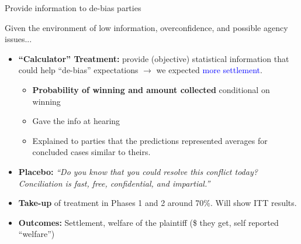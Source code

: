 \documentclass[9pt]{beamer}
\begin{document}

\begin{frame}{Provide information to de-bias parties}

    Given the environment of low information, overconfidence, and possible agency issues...
        \vspace{0.1in}
        
    \begin{itemize}
        \item \textbf{``Calculator'' Treatment:} provide (objective) statistical information that could help \alert{``de-bias'' expectations} $\rightarrow$ we expected  \textcolor{blue}{more settlement}.
          \begin{itemize}
              \vspace{.05in}
              \item \textbf{Probability of winning and amount collected} conditional on winning
              \vspace{.05in}
              \item Gave the info at hearing
                  \vspace{.05in}
                  \item Explained to parties that the predictions represented averages for concluded cases similar to theirs.

              
          \end{itemize}
        \vspace{0.1in}
        \pause
        \item \textbf{Placebo:} \textit{``Do you know that you could resolve this conflict today? Conciliation is fast, free, confidential,
and impartial.''}
        \vspace{0.1in}
        \pause
        \item \textbf{Take-up} of treatment in Phases 1 and 2 around 70\%. Will show ITT results.
           \vspace{0.1in}
        \item \textbf{Outcomes:} Settlement, welfare of the plaintiff (\$ they get, self reported ``welfare'') 
    \end{itemize}
\end{frame}
\end{document}
